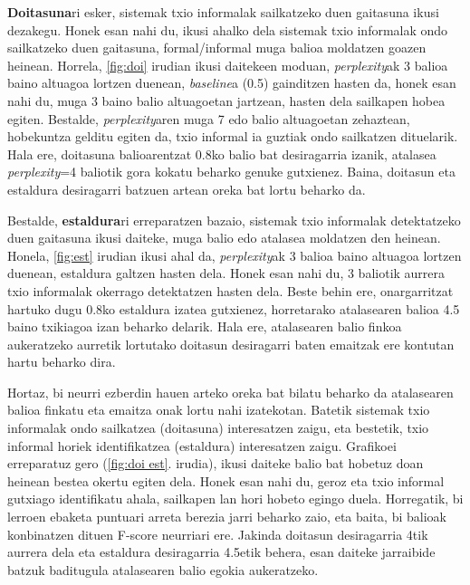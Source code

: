\documentclass[information,article,submit,moreauthors,pdftex,10pt,a4paper]{Definitions/mdpi}
\begin{document}
\textbf{Doitasuna}ri esker, sistemak txio informalak sailkatzeko duen gaitasuna ikusi dezakegu. Honek esan nahi du, ikusi ahalko dela sistemak txio informalak ondo sailkatzeko duen gaitasuna, formal/informal muga balioa moldatzen goazen heinean. Horrela, \ref{fig:doi} irudian ikusi daitekeen moduan, \textit{perplexity}ak 3 balioa baino altuagoa lortzen duenean, \textit{baseline}a (0.5) gainditzen hasten da, honek esan nahi du, muga 3 baino balio altuagoetan jartzean, hasten dela sailkapen hobea egiten. Bestalde, \textit{perplexity}aren muga 7 edo balio altuagoetan zehaztean, hobekuntza gelditu egiten da, txio informal ia guztiak ondo sailkatzen dituelarik. Hala ere, doitasuna balioarentzat 0.8ko balio bat desiragarria izanik, atalasea \textit{perplexity}=4 baliotik gora kokatu beharko genuke gutxienez. Baina, doitasun eta estaldura desiragarri batzuen artean oreka bat lortu beharko da.

Bestalde, \textbf{estaldura}ri erreparatzen bazaio, sistemak txio informalak detektatzeko duen gaitasuna ikusi daiteke, muga balio edo atalasea moldatzen den heinean. Honela, \ref{fig:est} irudian ikusi ahal da, \textit{perplexity}ak 3 balioa baino altuagoa lortzen duenean, estaldura galtzen hasten dela. Honek esan nahi du, 3 baliotik aurrera txio informalak okerrago detektatzen hasten dela. Beste behin ere, onargarritzat hartuko dugu 0.8ko estaldura izatea gutxienez, horretarako atalasearen balioa 4.5 baino txikiagoa izan beharko delarik. Hala ere, atalasearen balio finkoa aukeratzeko aurretik lortutako doitasun desiragarri baten emaitzak ere kontutan hartu beharko dira.

Hortaz, bi neurri ezberdin hauen arteko oreka bat bilatu beharko da atalasearen balioa finkatu eta emaitza onak lortu nahi izatekotan. Batetik sistemak txio informalak ondo sailkatzea (doitasuna) interesatzen zaigu, eta bestetik, txio informal horiek identifikatzea (estaldura) interesatzen zaigu. Grafikoei erreparatuz gero (\ref{fig:doi est}. irudia), ikusi daiteke balio bat hobetuz doan heinean bestea okertu egiten dela. Honek esan nahi du, geroz eta txio informal gutxiago identifikatu ahala, sailkapen lan hori hobeto egingo duela. Horregatik, bi lerroen ebaketa puntuari arreta berezia jarri beharko zaio, eta baita, bi balioak konbinatzen dituen F-score neurriari ere. Jakinda doitasun desiragarria 4tik aurrera dela eta estaldura desiragarria 4.5etik behera, esan daiteke jarraibide batzuk baditugula atalasearen balio egokia aukeratzeko.
\end{document}
